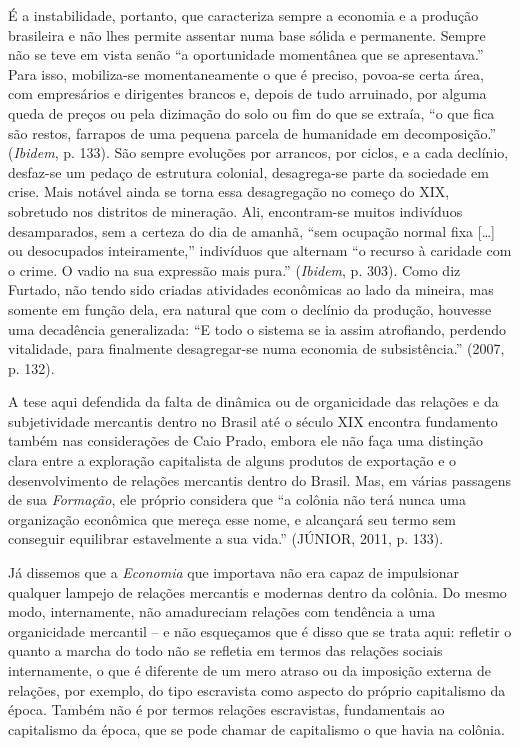 É a instabilidade, portanto, que caracteriza sempre a economia e a
produção brasileira e não lhes permite assentar numa base sólida e
permanente. Sempre não se teve em vista senão ``a oportunidade
momentânea que se apresentava.'' Para isso, mobiliza-se momentaneamente
o que é preciso, povoa-se certa área, com empresários e dirigentes
brancos e, depois de tudo arruinado, por alguma queda de preços ou pela
dizimação do solo ou fim do que se extraía, ``o que fica são restos,
farrapos de uma pequena parcela de humanidade em decomposição.''
(\emph{Ibidem}, p. 133). São sempre evoluções por arrancos, por ciclos,
e a cada declínio, desfaz-se um pedaço de estrutura colonial,
desagrega-se parte da sociedade em crise. Mais notável ainda se torna
essa desagregação no começo do XIX, sobretudo nos distritos de
mineração. Ali, encontram-se muitos indivíduos desamparados, sem a
certeza do dia de amanhã, ``sem ocupação normal fixa {[}\ldots{}{]} ou
desocupados inteiramente,'' indivíduos que alternam ``o recurso à
caridade com o crime. O vadio na sua expressão mais pura.''
(\emph{Ibidem}, p. 303). Como diz Furtado, não tendo sido criadas
atividades econômicas ao lado da mineira, mas somente em função dela,
era natural que com o declínio da produção, houvesse uma decadência
generalizada: ``E todo o sistema se ia assim atrofiando, perdendo
vitalidade, para finalmente desagregar-se numa economia de
subsistência.'' (2007, p. 132).

A tese aqui defendida da falta de dinâmica ou de organicidade das
relações e da subjetividade mercantis dentro no Brasil até o século XIX
encontra fundamento também nas considerações de Caio Prado, embora ele
não faça uma distinção clara entre a exploração capitalista de alguns
produtos de exportação e o desenvolvimento de relações mercantis dentro
do Brasil. Mas, em várias passagens de sua \emph{Formação}, ele próprio
considera que ``a colônia não terá nunca uma organização econômica que
mereça esse nome, e alcançará seu termo sem conseguir equilibrar
estavelmente a sua vida.'' (JÚNIOR, 2011, p. 133).

Já dissemos que a \emph{Economia} que importava não era capaz de
impulsionar qualquer lampejo de relações mercantis e modernas dentro da
colônia. Do mesmo modo, internamente, não amadureciam relações com
tendência a uma organicidade mercantil -- e não esqueçamos que é disso
que se trata aqui: refletir o quanto a marcha do todo não se refletia em
termos das relações sociais internamente, o que é diferente de um mero
atraso ou da imposição externa de relações, por exemplo, do tipo
escravista como aspecto do próprio capitalismo da época. Também não é
por termos relações escravistas, fundamentais ao capitalismo da época,
que se pode chamar de capitalismo o que havia na colônia.

